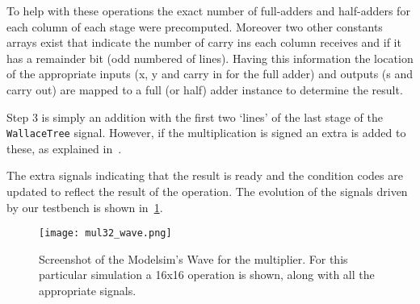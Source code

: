 To help with these operations the exact number of full-adders and half-adders for each column of each stage were precomputed. Moreover two other constants arrays exist that indicate the number of carry ins each column receives and if it has a remainder bit (odd numbered of lines).
Having this information the location of the appropriate inputs (x, y and carry in for the full adder) and outputs (s and carry out) are mapped to a full (or half) adder instance to determine the result.

Step 3 is simply an addition with the first two `lines' of the last stage of the \texttt{WallaceTree} signal. However, if the multiplication is signed an extra \STDV is added to these, as explained in~\cite{part3}.

The extra signals indicating that the result is ready and the condition codes are updated to reflect the result of the operation.  
The evolution of the signals driven by our testbench is shown in~\ref{fig:mul32_wave}.


\begin{figure}[H]
\centering
\texttt{[image: mul32\_wave.png]}
\caption{Screenshot of the Modelsim's Wave for the multiplier. For this particular simulation a 16x16 operation is shown, along with all the appropriate signals.}
\label{fig:mul32_wave}
\end{figure}